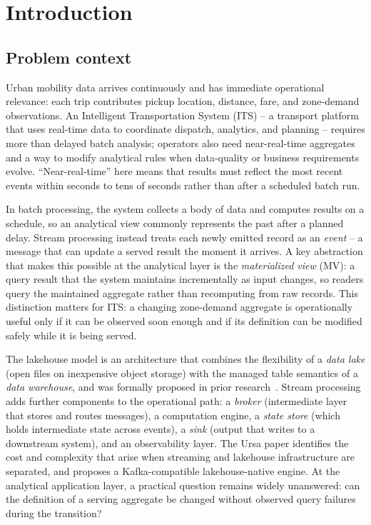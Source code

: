 \section{Introduction}\label{sec:introduction}

\subsection{Problem context}
Urban mobility data arrives continuously and has immediate operational relevance: each trip contributes pickup location, distance, fare, and zone-demand observations. An Intelligent Transportation System (ITS) -- a transport platform that uses real-time data to coordinate dispatch, analytics, and planning -- requires more than delayed batch analysis; operators also need near-real-time aggregates and a way to modify analytical rules when data-quality or business requirements evolve. ``Near-real-time'' here means that results must reflect the most recent events within seconds to tens of seconds rather than after a scheduled batch run.

In batch processing, the system collects a body of data and computes results on a schedule, so an analytical view commonly represents the past after a planned delay. Stream processing instead treats each newly emitted record as an \emph{event} -- a message that can update a served result the moment it arrives. A key abstraction that makes this possible at the analytical layer is the \emph{materialized view} (MV): a query result that the system maintains incrementally as input changes, so readers query the maintained aggregate rather than recomputing from raw records. This distinction matters for ITS: a changing zone-demand aggregate is operationally useful only if it can be observed soon enough and if its definition can be modified safely while it is being served.

The lakehouse model is an architecture that combines the flexibility of a \emph{data lake} (open files on inexpensive object storage) with the managed table semantics of a \emph{data warehouse}, and was formally proposed in prior research~\cite{armbrust2021lakehouse}. Stream processing adds further components to the operational path: a \emph{broker} (intermediate layer that stores and routes messages), a computation engine, a \emph{state store} (which holds intermediate state across events), a \emph{sink} (output that writes to a downstream system), and an observability layer. The Ursa paper \parencite{merli2025ursa} identifies the cost and complexity that arise when streaming and lakehouse infrastructure are separated, and proposes a Kafka-compatible lakehouse-native engine. At the analytical application layer, a practical question remains widely unanswered: can the definition of a serving aggregate be changed without observed query failures during the transition?

